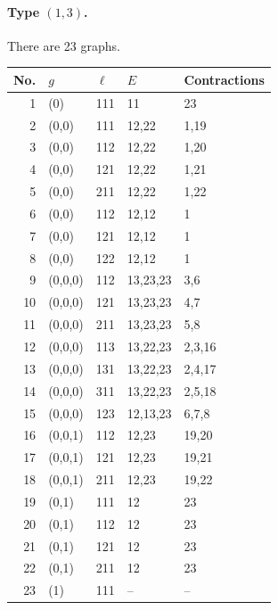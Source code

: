 \documentclass[11pt,a4paper]{article}
\theoremstyle{definition}
\begin{document}
\begin{samepage}
\paragraph{Type $(1,3)$.} There are 23 graphs.
\begin{center}\small
\begin{tabular}{rllll}\toprule
No.&$g$&$\ell$&$E$&Contractions\\\midrule
1 & (0) & 111 & 11 & 23\\
2 & (0,0) & 111 & 12,22 & 1,19\\
3 & (0,0) & 112 & 12,22 & 1,20\\
4 & (0,0) & 121 & 12,22 & 1,21\\
5 & (0,0) & 211 & 12,22 & 1,22\\
6 & (0,0) & 112 & 12,12 & 1\\
7 & (0,0) & 121 & 12,12 & 1\\
8 & (0,0) & 122 & 12,12 & 1\\
9 & (0,0,0) & 112 & 13,23,23 & 3,6\\
10 & (0,0,0) & 121 & 13,23,23 & 4,7\\
11 & (0,0,0) & 211 & 13,23,23 & 5,8\\
12 & (0,0,0) & 113 & 13,22,23 & 2,3,16\\
13 & (0,0,0) & 131 & 13,22,23 & 2,4,17\\
14 & (0,0,0) & 311 & 13,22,23 & 2,5,18\\
15 & (0,0,0) & 123 & 12,13,23 & 6,7,8\\
16 & (0,0,1) & 112 & 12,23 & 19,20\\
17 & (0,0,1) & 121 & 12,23 & 19,21\\
18 & (0,0,1) & 211 & 12,23 & 19,22\\
19 & (0,1) & 111 & 12 & 23\\
20 & (0,1) & 112 & 12 & 23\\
21 & (0,1) & 121 & 12 & 23\\
22 & (0,1) & 211 & 12 & 23\\
23 & (1) & 111 & -- & --\\
\bottomrule\end{tabular}\end{center}
\end{samepage}
\end{document}
